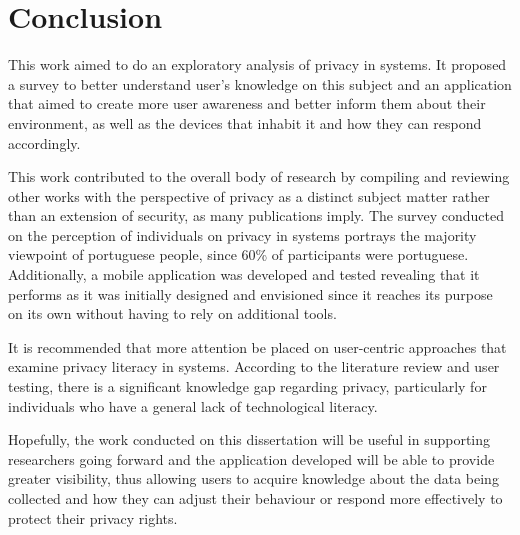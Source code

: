 %
%
\section{Conclusion}\label{section:conclusion}

This work aimed to do an exploratory analysis of privacy in \hyperlink{\acronym}{\acronym} systems.
It proposed a survey to better understand user's knowledge on this subject
and an application that aimed to create more user awareness and better inform
them about their environment, as well as the \hyperlink{\acronym}{\acronym} devices that inhabit it and
how they can respond accordingly.

This work contributed to the overall body of research by compiling and reviewing
other works with the perspective of privacy as a distinct subject matter rather than
an extension of security, as many publications imply. The survey conducted
on the perception of individuals on privacy in \hyperlink{\acronym}{\acronym} systems portrays the majority
viewpoint of portuguese people, since 60\% of participants were portuguese. Additionally,
a mobile application was developed and tested revealing that it performs as it was
initially designed and envisioned since it reaches its purpose on its own without having
to rely on additional tools.

It is recommended that more attention be placed on user-centric approaches that
examine privacy literacy in \hyperlink{\acronym}{\acronym} systems. According to the literature review and
user testing, there is a significant knowledge gap regarding \hyperlink{\acronym}{\acronym} privacy, particularly
for individuals who have a general lack of technological literacy.

Hopefully, the work conducted on this dissertation will be useful in
supporting researchers going forward and the application developed will be able to
provide greater visibility, thus allowing users to acquire knowledge about
the data being collected and how they can adjust their behaviour or respond
more effectively to protect their privacy rights.
